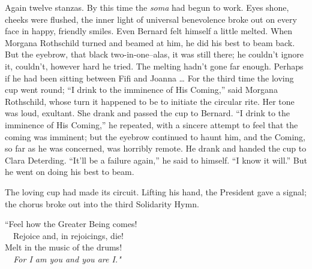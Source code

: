 \documentclass[12pt]{report}
\begin{document}
Again twelve stanzas. By this time the \emph{soma} had begun to work.
Eyes shone, cheeks were flushed, the inner light of universal
benevolence broke out on every face in happy, friendly smiles. Even
Bernard felt himself a little melted. When Morgana Rothschild turned and
beamed at him, he did his best to beam back. But the eyebrow, that black
two-in-one--alas, it was still there; he couldn't ignore it, couldn't,
however hard he tried. The melting hadn't gone far enough. Perhaps if he
had been sitting between Fifi and Joanna \ldots{} For the third time the
loving cup went round; ``I drink to the imminence of His Coming,'' said
Morgana Rothschild, whose turn it happened to be to initiate the
circular rite. Her tone was loud, exultant. She drank and passed the cup
to Bernard. ``I drink to the imminence of His Coming,'' he repeated,
with a sincere attempt to feel that the coming was imminent; but the
eyebrow continued to haunt him, and the Coming, so far as he was
concerned, was horribly remote. He drank and handed the cup to Clara
Deterding. ``It'll be a failure again,'' he said to himself. ``I know it
will.'' But he went on doing his best to beam.

The loving cup had made its circuit. Lifting his hand, the President
gave a signal; the chorus broke out into the third Solidarity Hymn.

\emph{}

``Feel how the Greater Being comes!\\

~~Rejoice and, in rejoicings, die!\\

Melt in the music of the drums!\\

\emph{~~For I am you and you are I."\\
}
\end{document}
